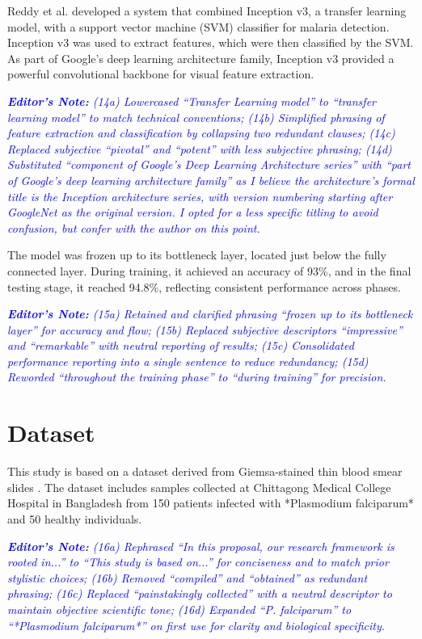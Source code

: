 \documentclass[journal,12pt,onecolumn,draftcls]{IEEEtran}
\newcommand{\editornote}[1]{\par\textit{\textcolor{blue}{\textbf{Editor's Note:} #1}}\par}
\begin{document}
Reddy et al. \cite{reddy2021} developed a system that combined Inception v3, a transfer learning model, with a support vector machine (SVM) classifier for malaria detection. Inception v3 was used to extract features, which were then classified by the SVM. As part of Google’s deep learning architecture family, Inception v3 provided a powerful convolutional backbone for visual feature extraction.

\editornote{(14a) Lowercased “Transfer Learning model” to “transfer learning model” to match technical conventions; 
(14b) Simplified phrasing of feature extraction and classification by collapsing two redundant clauses; 
(14c) Replaced subjective “pivotal” and “potent” with less subjective phrasing; 
(14d) Substituted “component of Google’s Deep Learning Architecture series” with “part of Google’s deep learning architecture family” as I believe the architecture's formal title is the Inception architecture series, with version numbering starting after GoogleNet as the original version. I opted for a less specific titling to avoid confusion, but confer with the author on this point.}

The model was frozen up to its bottleneck layer, located just below the fully connected layer. During training, it achieved an accuracy of 93\%, and in the final testing stage, it reached 94.8\%, reflecting consistent performance across phases.

\editornote{(15a) Retained and clarified phrasing “frozen up to its bottleneck layer” for accuracy and flow; 
(15b) Replaced subjective descriptors “impressive” and “remarkable” with neutral reporting of results; 
(15c) Consolidated performance reporting into a single sentence to reduce redundancy; 
(15d) Reworded “throughout the training phase” to “during training” for precision.}

\section{Dataset}
This study is based on a dataset derived from Giemsa-stained thin blood smear slides \cite{chakradeo2020}. The dataset includes samples collected at Chittagong Medical College Hospital in Bangladesh from 150 patients infected with *Plasmodium falciparum* and 50 healthy individuals.

\editornote{(16a) Rephrased “In this proposal, our research framework is rooted in...” to “This study is based on...” for conciseness and to match prior stylistic choices; 
(16b) Removed “compiled” and “obtained” as redundant phrasing; 
(16c) Replaced “painstakingly collected” with a neutral descriptor to maintain objective scientific tone; 
(16d) Expanded “P. falciparum” to “*Plasmodium falciparum*” on first use for clarity and biological specificity.}
\end{document}
